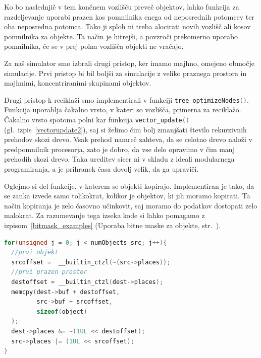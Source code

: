 \documentclass[a4paper,12pt]{article}
\begin{document}
Ko bo naslednjič v tem končnem vozlišču preveč objektov, lahko funkcija za razdeljevanje uporabi prazen kos pomnilnika enega
od neposrednih potomcev ter oba neposredna potomca. Tako ji sploh ni treba alocirati novih vozlišč ali kosov pomnilnika za objekte.
Ta način je hitrejši, a povzroči prekomerno uporabo pomnilnika, če se v prej polna vozlišča objekti ne vračajo.

Za naš simulator smo izbrali drugi pristop, ker imamo majhno, omejeno območje simulacije. Prvi pristop bi bil
boljši za simulacije z veliko praznega prostora in majhnimi, koncentriranimi skupinami objektov.

Drugi pristop k reciklaži smo implementirali v funkciji \lstinline[language=C]{tree_optimizeNodes()}.
Funkcija uporablja čakalno vrsto, v kateri so vozlišča, primerna za reciklažo. Čakalno vrsto spotoma polni
kar funkcija \lstinline[language=C]{vector_update()} (gl.\ izpis~\ref{vectorupdate2}),
saj si želimo čim bolj zmanjšati število rekurzivnih prehodov skozi drevo.
Vsak prehod namreč zahteva, da se celotno drevo naloži v predpomnilnik procesorja, zato je dobro, da vse delo
opravimo v čim manj prehodih skozi drevo. Taka ureditev sicer ni v skladu z ideali modularnega programiranja,
a je prihranek časa dovolj velik, da ga upraviči.

Oglejmo si del funkcije, v katerem se objekti kopirajo. Implementiran je tako, da se zanka izvede samo tolikokrat,
kolikor je objektov, ki jih moramo kopirati. Ta način kopiranja je zelo časovno učinkovit, saj moramo do podatkov
dostopati zelo malokrat. Za razumevanje tega izseka kode si lahko pomagamo z izpisom~\ref{bitmask_examples}
(Uporaba bitne maske za objekte, str.\ \pageref{bitmask_examples}).
\begin{lstlisting}[caption={tree\_optimizeNodes() -- Kopiranje objektov}, label=optimizenodes, language=C]
for(unsigned j = 0; j < numObjects_src; j++){
  //prvi objekt
  srcoffset =  __builtin_ctzl(~(src->places));
  //prvi prazen prostor
  destoffset = __builtin_ctzl(dest->places);
  memcpy(dest->buf + destoffset,
         src->buf + srcoffset,
         sizeof(object)
  );
  dest->places &= ~(1UL << destoffset);
  src->places |= (1UL << srcoffset);
}
\end{lstlisting}

\newpage
\end{document}
